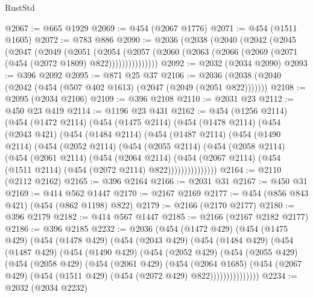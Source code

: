 \begin{lexlean}{RustStd}
\begin{coremodule}
{\begin{coremodule}
{{{{{{{{{{{{{{{{{{{{{{{{{{{{{{{{@2067 := @665 @1929
@2069 := @454 (@2067 @1776)
@2071 := @454 (@1511 @1605)
@2072 := @783 @886
@2090 := @2036
    (@2038
      (@2040
        (@2042
          (@2045
            (@2047
              (@2049
                (@2051
                  (@2054
                    (@2057
                      (@2060 (@2063 (@2066 (@2069 (@2071 (@454 (@2072 @1809) @822)))))))))))))))
@2092 := @2032 (@2034 @2090)
@2093 := @396 @2092
@2095 := @871 @25 @37
@2106 := @2036 (@2038 (@2040 (@2042 (@454 (@507 @402 @1613) (@2047 (@2049 (@2051 @822)))))))
@2108 := @2095 (@2034 @2106)
@2109 := @396 @2108
@2110 := @2031 @23
@2112 := @450 @23 @419
@2114 := @1196 @23 @431
@2162 := @454
    (@1256 @2114)
    (@454
      (@1472 @2114)
      (@454
        (@1475 @2114)
        (@454
          (@1478 @2114)
          (@454
            (@2043 @421)
            (@454
              (@1484 @2114)
              (@454
                (@1487 @2114)
                (@454
                  (@1490 @2114)
                  (@454
                    (@2052 @2114)
                    (@454
                      (@2055 @2114)
                      (@454
                        (@2058 @2114)
                        (@454
                          (@2061 @2114)
                          (@454
                            (@2064 @2114)
                            (@454
                              (@2067 @2114)
                              (@454 (@1511 @2114) (@454 (@2072 @2114) @822)))))))))))))))
@2164 := @2110 (@2112 @2162)
@2165 := @396 @2164
@2166 := @2031 @31
@2167 := @450 @31
@2169 := @414 @562 @1447
@2170 := @2167 @2169
@2177 := @454 (@856 @843 @421) (@454 (@862 @1198) @822)
@2179 := @2166 (@2170 @2177)
@2180 := @396 @2179
@2182 := @414 @567 @1447
@2185 := @2166 (@2167 @2182 @2177)
@2186 := @396 @2185
@2232 := @2036
    (@454
      (@1472 @429)
      (@454
        (@1475 @429)
        (@454
          (@1478 @429)
          (@454
            (@2043 @429)
            (@454
              (@1484 @429)
              (@454
                (@1487 @429)
                (@454
                  (@1490 @429)
                  (@454
                    (@2052 @429)
                    (@454
                      (@2055 @429)
                      (@454
                        (@2058 @429)
                        (@454
                          (@2061 @429)
                          (@454
                            (@2064 @1685)
                            (@454
                              (@2067 @429)
                              (@454 (@1511 @429) (@454 (@2072 @429) @822)))))))))))))))
@2234 := @2032 (@2034 @2232)
}}}}}}}}}}}}}}}}}}}}}}}}}}}}}}}}
\end{coremodule}}
\end{coremodule}
\end{lexlean}
